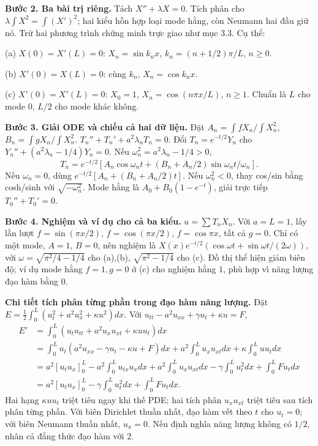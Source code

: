 \textbf{Bước 2. Ba bài trị riêng.} Tách $X''+\lambda X=0$. Tích phân cho $\lambda\int X^2=\int(X')^2$; hai kiểu hỗn hợp loại mode hằng, còn Neumann hai đầu giữ nó. Trừ hai phương trình chứng minh trực giao như mục 3.3. Cụ thể:

(a) $X(0)=X'(L)=0$: $X_n=\sin k_nx$, $k_n=(n+1/2)\pi/L$, $n\ge0$.

(b) $X'(0)=X(L)=0$: cùng $k_n$, $X_n=\cos k_nx$.

(c) $X'(0)=X'(L)=0$: $X_0=1$, $X_n=\cos(n\pi x/L)$, $n\ge1$. Chuẩn là $L$ cho mode $0$, $L/2$ cho mode khác không.

\textbf{Bước 3. Giải ODE và chiếu cả hai dữ liệu.} Đặt $A_n=\int fX_n/\int X_n^2$, $B_n=\int gX_n/\int X_n^2$. $T_n''+T_n'+a^2\lambda_nT_n=0$. Đổi $T_n=e^{-t/2}Y_n$ cho $Y_n''+(a^2\lambda_n-1/4)Y_n=0$. Nếu $\omega_n^2=a^2\lambda_n-1/4>0$,
\[T_n=e^{-t/2}[A_n\cos\omega_nt+(B_n+A_n/2)\sin\omega_nt/\omega_n].\]
Nếu $\omega_n=0$, dùng $e^{-t/2}[A_n+(B_n+A_n/2)t]$. Nếu $\omega_n^2<0$, thay cos/sin bằng cosh/sinh với $\sqrt{-\omega_n^2}$. Mode hằng là $A_0+B_0(1-e^{-t})$, giải trực tiếp $T_0''+T_0'=0$.

\textbf{Bước 4. Nghiệm và ví dụ cho cả ba kiểu.} $u=\sum T_nX_n$. Với $a=L=1$, lấy lần lượt $f=\sin(\pi x/2)$, $f=\cos(\pi x/2)$, $f=\cos\pi x$, tất cả $g=0$. Chỉ có một mode, $A=1$, $B=0$, nên nghiệm là $X(x)e^{-t/2}(\cos\omega t+\sin\omega t/(2\omega))$, với $\omega=\sqrt{\pi^2/4-1/4}$ cho (a),(b), $\sqrt{\pi^2-1/4}$ cho (c). Đồ thị thể hiện giảm biên độ; ví dụ mode hằng $f=1,g=0$ ở (c) cho nghiệm hằng $1$, phù hợp vì năng lượng đạo hàm bằng $0$.

\textbf{Chi tiết tích phân từng phần trong đạo hàm năng lượng.} Đặt $E=\frac12\int_0^L(u_t^2+a^2u_x^2+\kappa u^2)dx$. Với $u_{tt}-a^2u_{xx}+\gamma u_t+\kappa u=F$,
\[\begin{aligned}
E'&=\int_0^L(u_tu_{tt}+a^2u_xu_{xt}+\kappa uu_t)dx\\
&=\int_0^Lu_t(a^2u_{xx}-\gamma u_t-\kappa u+F)dx
+a^2\int_0^Lu_xu_{xt}dx+\kappa\int_0^Luu_tdx\\
&=a^2[u_tu_x]_0^L-a^2\int_0^Lu_{tx}u_xdx
+a^2\int_0^Lu_xu_{xt}dx-\gamma\int_0^Lu_t^2dx+\int_0^LFu_tdx\\
&=a^2[u_tu_x]_0^L-\gamma\int_0^Lu_t^2dx+\int_0^LFu_tdx.
\end{aligned}\]
Hai hạng $\kappa uu_t$ triệt tiêu ngay khi thế PDE; hai tích phân $u_xu_{xt}$ triệt tiêu sau tích phân từng phần. Với biên Dirichlet thuần nhất, đạo hàm vết theo $t$ cho $u_t=0$; với biên Neumann thuần nhất, $u_x=0$. Nếu định nghĩa năng lượng không có $1/2$, nhân cả đẳng thức đạo hàm với $2$.

